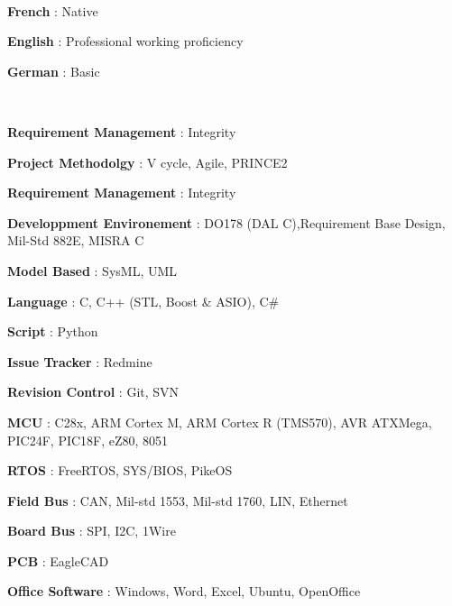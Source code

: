 \\
\begin{cvitems}
	\item \textbf{French} : Native
	\item \textbf{English} : Professional working proficiency
	\item \textbf{German} : Basic
\end{cvitems}

\\
\begin{cvitems}
	\item \textbf{Requirement Management} : Integrity
	\item \textbf{Project Methodolgy} : V cycle, Agile, PRINCE2
    \item \textbf{Requirement Management} : Integrity	
    \item \textbf{Developpment Environement} : DO178 (DAL C),Requirement Base Design, Mil-Std 882E, MISRA C
    	\item \textbf{Model Based} : SysML, UML
	\item \textbf{Language} : C, C++ (STL, Boost \& ASIO), C\#
    \item \textbf{Script} : Python	
	\item \textbf{Issue Tracker} : Redmine
	\item \textbf{Revision Control} : Git, SVN	
    \item \textbf{MCU} : C28x, ARM Cortex M, ARM Cortex R (TMS570), AVR ATXMega, PIC24F, PIC18F, eZ80, 8051
    \item \textbf{RTOS} : FreeRTOS, SYS/BIOS, PikeOS
    \item \textbf{Field Bus} : CAN, Mil-std 1553, Mil-std 1760, LIN, Ethernet
    \item \textbf{Board Bus} : SPI, I2C, 1Wire
    \item \textbf{PCB} : EagleCAD             
    \item \textbf{Office Software} : Windows, Word, Excel, Ubuntu, OpenOffice			
\end{cvitems}

